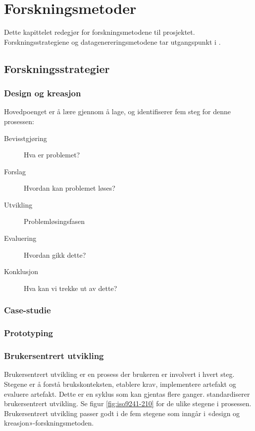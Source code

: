 \chapter{Forskningsmetoder}
\label{ch:method}
Dette kapittelet redegjør for forskningsmetodene til prosjektet. Forskningsstrategiene og datagenereringsmetodene
tar utgangspunkt i \citet{oates}.

\section{Forskningsstrategier}

\subsection{Design og kreasjon}
Hovedpoenget er å lære gjennom å lage, og \citet{oates} identifiserer fem steg for denne prosessen:

\begin{description}
  \item[Bevisstgjøring] Hva er problemet?
  \item[Forslag] Hvordan kan problemet løses?
  \item[Utvikling] Problemløsingsfasen
  \item[Evaluering] Hvordan gikk dette?
  \item[Konklusjon] Hva kan vi trekke ut av dette?
\end{description}

\subsection{Case-studie}
    
\subsection{Prototyping}

\subsection{Brukersentrert utvikling}
Brukersentrert utvikling er en prosess der brukeren er involvert i hvert steg.
Stegene er å forstå brukskonteksten, etablere krav, implementere artefakt og evaluere artefakt. Dette er en syklus som kan gjentas flere ganger.
\citet{dis20099241} standardiserer brukersentrert utvikling. Se figur \ref{fig:iso9241-210}
for de ulike stegene i prosessen.
Brukersentrert utvikling passer godt i de fem stegene som inngår i «design og kreasjon»-forskningsmetoden.

